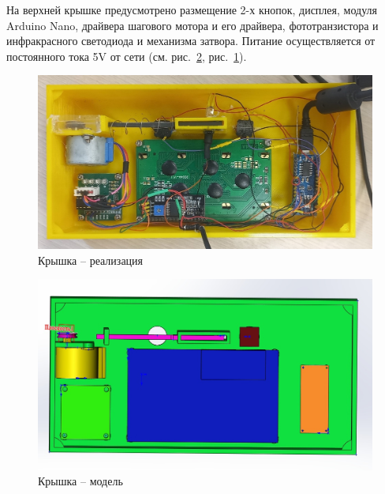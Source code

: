 На верхней крышке предусмотрено размещение 2-х кнопок, дисплея, модуля Arduino Nano, драйвера шагового мотора и его драйвера, фототранзистора и инфракрасного светодиода и механизма затвора. Питание осуществляется от постоянного тока 5V от сети (см. рис.~\ref{ris:kryshka_model}, рис.~\ref{ris:kryshka_real}).  

\begin{figure}[H]
	\centering
	\includegraphics[width=12cm]{pics/kryshka_real.jpg}
	\caption{Крышка -- реализация}
	\label{ris:kryshka_real}
\end{figure}
\par\medskip

\begin{figure}[H]
	\centering
	\includegraphics[width=12cm]{pics/kryshka_model.jpg}
	\caption{Крышка -- модель}
	\label{ris:kryshka_model}
\end{figure}
\par\medskip